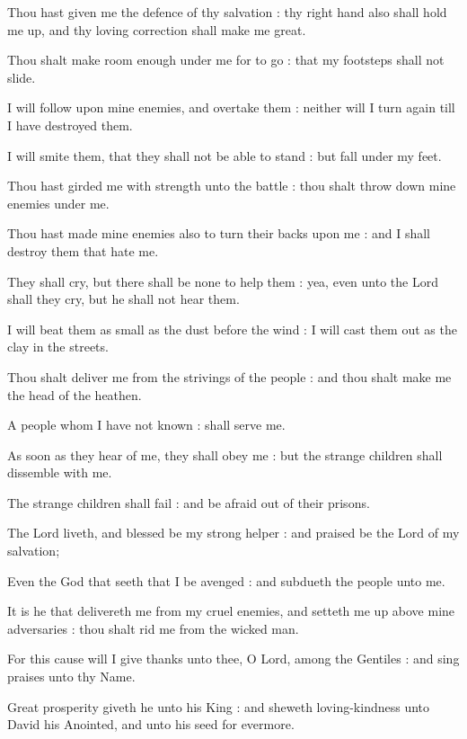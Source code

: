 Thou hast given me the defence of thy salvation : thy right hand also shall hold me up, and thy loving correction shall make me great.\par
{}Thou shalt make room enough under me for to go : that my footsteps shall not slide.\par
{}I will follow upon mine enemies, and overtake them : neither will I turn again till I have destroyed them.\par
{}I will smite them, that they shall not be able to stand : but fall under my feet.\par
{}Thou hast girded me with strength unto the battle : thou shalt throw down mine enemies under me.\par
{}Thou hast made mine enemies also to turn their backs upon me : and I shall destroy them that hate me.\par
{}They shall cry, but there shall be none to help them : yea, even unto the Lord shall they cry, but he shall not hear them.\par
{}I will beat them as small as the dust before the wind : I will cast them out as the clay in the streets.\par
{}Thou shalt deliver me from the strivings of the people : and thou shalt make me the head of the heathen.\par
{}A people whom I have not known : shall serve me.\par
{}As soon as they hear of me, they shall obey me : but the strange children shall dissemble with me.\par
{}The strange children shall fail : and be afraid out of their prisons.\par
{}The Lord liveth, and blessed be my strong helper : and praised be the Lord of my salvation;\par
{}Even the God that seeth that I be avenged : and subdueth the people unto me.\par
{}It is he that delivereth me from my cruel enemies, and setteth me up above mine adversaries : thou shalt rid me from the wicked man.\par
{}For this cause will I give thanks unto thee, O Lord, among the Gentiles : and sing praises unto thy Name.\par
{}Great prosperity giveth he unto his King : and sheweth loving-kindness unto David his Anointed, and unto his seed for evermore.\par

